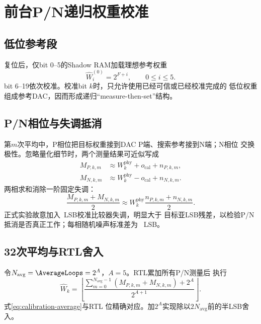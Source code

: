\documentclass[11pt,a4paper,UTF8,fontset=none,openany]{ctexrep}
\numberwithin{equation}{chapter}
\numberwithin{figure}{chapter}
\numberwithin{table}{chapter}
\begin{document}
\section{前台P/N递归权重校准}

\subsection{低位参考段}

复位后，仅bit 0--5的Shadow RAM加载理想参考权重
\begin{equation}
  \widehat{W}_i^{(0)}=2^{F+i},\qquad 0\le i\le 5.
  \label{eq:trusted-reference}
\end{equation}
bit 6--19依次校准。校准bit $k$时，只允许使用已经可信或已经校准完成的
低位权重组成参考DAC，因而形成递归“measure-then-set”结构。

\subsection{P/N相位与失调抵消}

第$m$次平均中，P相位把目标权重接到DAC P端、搜索参考接到N端；N相位
交换极性。忽略量化细节时，两个测量结果可近似写成
\begin{align}
  M_{P,k,m} &\approx W_k^{\mathrm{phy}}+o_{\mathrm{cal}}+n_{P,k,m},
  \label{eq:p-measure}\\
  M_{N,k,m} &\approx W_k^{\mathrm{phy}}-o_{\mathrm{cal}}+n_{N,k,m}.
  \label{eq:n-measure}
\end{align}
两相求和消除一阶固定失调：
\begin{equation}
  \frac{M_{P,k,m}+M_{N,k,m}}{2}
  \approx W_k^{\mathrm{phy}}
  \frac{n_{P,k,m}+n_{N,k,m}}{2}.
  \label{eq:offset-cancel}
\end{equation}
正式实验故意加入\CalibrationOffsetLsb\ LSB校准比较器失调，明显大于
目标亚LSB残差，以检验P/N抵消是否真正工作；每相随机噪声标准差为
\CalibrationNoiseLsb\ LSB。

\subsection{32次平均与RTL舍入}

令$N_{\mathrm{avg}}=\AverageLoops=2^{A}$，$A=5$。RTL累加所有P/N测量后
执行
\begin{equation}
  \widehat{W}_k=
  \left\lfloor
  \frac{
    \displaystyle\sum_{m=0}^{N_{\mathrm{avg}}-1}
    \left(M_{P,k,m}+M_{N,k,m}\right)+2^A
  }{2^{A+1}}
  \right\rfloor.
  \label{eq:calibration-average}
\end{equation}
式\eqref{eq:calibration-average}与RTL
位精确对应。加$2^A$实现除以$2N_{\mathrm{avg}}$前的半LSB舍入。
\end{document}
